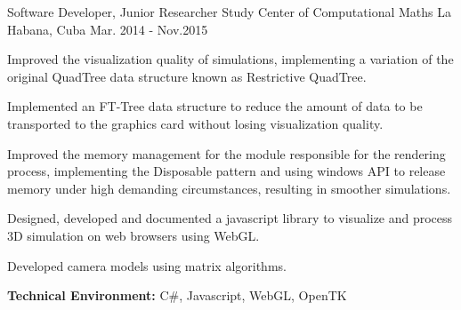 \begin{cventries}

\workexperienceentry
{Software Developer, Junior Researcher} %
{Study Center of Computational Maths} %
{La Habana, Cuba} %
{Mar. 2014 - Nov.2015} %
{ %
\begin{cvitems}
	\item {Improved the visualization quality of simulations, implementing a variation of the original QuadTree data structure known as Restrictive QuadTree.}
	\item {Implemented an FT-Tree data structure to reduce the amount of data to be transported to the graphics card without losing visualization quality.}
	\item {Improved the memory management for the module responsible for the rendering process, implementing the Disposable pattern and using windows API to release memory under high demanding circumstances, resulting in smoother simulations.}
	\item {Designed, developed and documented a javascript library to visualize and process 3D simulation on web browsers
	using WebGL.}
	\item {Developed camera models using matrix algorithms.}
\end{cvitems}
}
{\textbf{Technical Environment:} C\#, Javascript, WebGL, OpenTK}
\end{cventries}